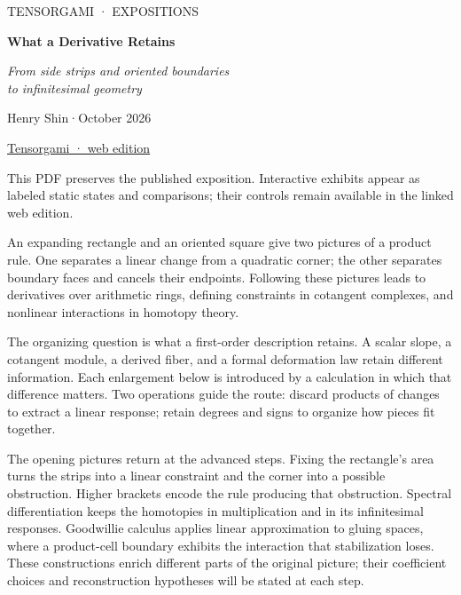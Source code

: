 \documentclass[11pt,letterpaper]{article}
\begin{document}
\color{ink}
\thispagestyle{empty}
{\sffamily\small\textcolor{accent}{TENSORGAMI · EXPOSITIONS}\par}
\vspace{.6em}
{\LARGE\bfseries What a Derivative Retains\par}
\vspace{.4em}
{\large\itshape From side strips and oriented boundaries\\to infinitesimal geometry\par}
\vspace{.65em}
{Henry Shin\hspace{.6em}·\hspace{.6em}October 2026\par}
\vspace{.3em}
{\small\href{https://tensorgami.com/notes/what-a-derivative-retains.html}{Tensorgami · web edition}\par}
\vspace{.8em}
{\small This PDF preserves the published exposition. Interactive exhibits appear as labeled static states and comparisons; their controls remain available in the linked web edition.\par}
\vspace{.6em}

An expanding rectangle and an oriented square give two pictures of a product rule. One separates a linear change from a quadratic corner; the other separates boundary faces and cancels their endpoints. Following these pictures leads to derivatives over arithmetic rings, defining constraints in cotangent complexes, and nonlinear interactions in homotopy theory.


The organizing question is what a first-order description retains. A scalar slope, a cotangent module, a derived fiber, and a formal deformation law retain different information. Each enlargement below is introduced by a calculation in which that difference matters. Two operations guide the route: discard products of changes to extract a linear response; retain degrees and signs to organize how pieces fit together.


The opening pictures return at the advanced steps. Fixing the rectangle's area turns the strips into a linear constraint and the corner into a possible obstruction. Higher brackets encode the rule producing that obstruction. Spectral differentiation keeps the homotopies in multiplication and in its infinitesimal responses. Goodwillie calculus applies linear approximation to gluing spaces, where a product-cell boundary exhibits the interaction that stabilization loses. These constructions enrich different parts of the original picture; their coefficient choices and reconstruction hypotheses will be stated at each step.
\end{document}
